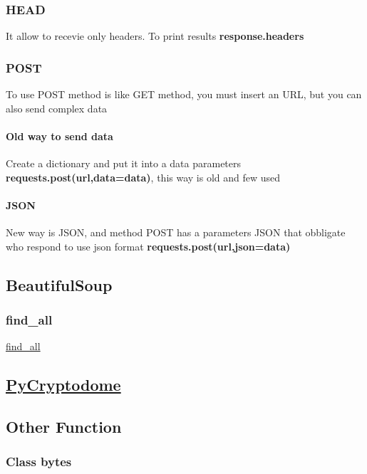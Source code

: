 \documentclass{article}
\begin{document}
                                \subsubsection{HEAD}
                                        It allow to recevie only headers. To print results \textbf{response.headers} 
                                \subsubsection{POST}
                                    To use POST method is like GET method, you must insert an URL, but you can also send complex data
                                        \paragraph{Old way to send data}
                                            Create a dictionary and put it into a data parameters \textbf{requests.post(url,data=data)}, this way is old and few used
                                        \paragraph{JSON}
                                            New way is JSON, and method POST has a parameters JSON that obbligate who respond to use json format  \textbf{requests.post(url,json=data)}
                \subsection{BeautifulSoup}
                                    \subsubsection{find\_all}
                                        \href{https://www.crummy.com/software/BeautifulSoup/bs4/doc/\#searching\-the\-tree}{find\_all}
                \subsection{\hyperref[https://pycryptodome.readthedocs.io/en/latest/index.html]{PyCryptodome}} 
                \subsection{Other Function}
                                        \subsubsection{Class bytes}
\end{document}
